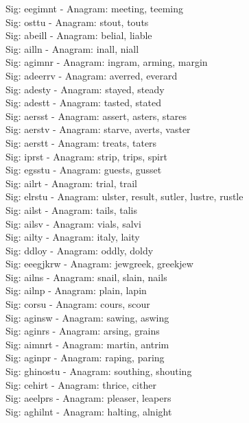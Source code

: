 Sig: {eegimnt} - Anagram: meeting, teeming \\
Sig: {osttu} - Anagram: stout, touts \\
Sig: {abeill} - Anagram: belial, liable \\
Sig: {ailln} - Anagram: inall, niall \\
Sig: {agimnr} - Anagram: ingram, arming, margin \\
Sig: {adeerrv} - Anagram: averred, everard \\
Sig: {adesty} - Anagram: stayed, steady \\
Sig: {adestt} - Anagram: tasted, stated \\
Sig: {aersst} - Anagram: assert, asters, stares \\
Sig: {aerstv} - Anagram: starve, averts, vaster \\
Sig: {aerstt} - Anagram: treats, taters \\
Sig: {iprst} - Anagram: strip, trips, spirt \\
Sig: {egsstu} - Anagram: guests, gusset \\
Sig: {ailrt} - Anagram: trial, trail \\
Sig: {elrstu} - Anagram: ulster, result, sutler, lustre, rustle \\
Sig: {ailst} - Anagram: tails, talis \\
Sig: {ailsv} - Anagram: vials, salvi \\
Sig: {ailty} - Anagram: italy, laity \\
Sig: {ddloy} - Anagram: oddly, doldy \\
Sig: {eeegjkrw} - Anagram: jewgreek, greekjew \\
Sig: {ailns} - Anagram: snail, slain, nails \\
Sig: {ailnp} - Anagram: plain, lapin \\
Sig: {corsu} - Anagram: cours, scour \\
Sig: {aginsw} - Anagram: sawing, aswing \\
Sig: {aginrs} - Anagram: arsing, grains \\
Sig: {aimnrt} - Anagram: martin, antrim \\
Sig: {aginpr} - Anagram: raping, paring \\
Sig: {ghinostu} - Anagram: southing, shouting \\
Sig: {cehirt} - Anagram: thrice, cither \\
Sig: {aeelprs} - Anagram: pleaser, leapers \\
Sig: {aghilnt} - Anagram: halting, alnight \\

